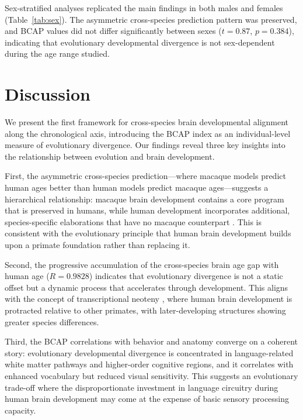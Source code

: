 \documentclass[11pt]{article}
\begin{document}
Sex-stratified analyses replicated the main findings in both males and females (Table~\ref{tab:sex}). The asymmetric cross-species prediction pattern was preserved, and BCAP values did not differ significantly between sexes ($t = 0.87$, $p = 0.384$), indicating that evolutionary developmental divergence is not sex-dependent during the age range studied.

\section{Discussion}

We present the first framework for cross-species brain developmental alignment along the chronological axis, introducing the BCAP index as an individual-level measure of evolutionary divergence. Our findings reveal three key insights into the relationship between evolution and brain development.

First, the asymmetric cross-species prediction---where macaque models predict human ages better than human models predict macaque ages---suggests a hierarchical relationship: macaque brain development contains a core program that is preserved in humans, while human development incorporates additional, species-specific elaborations that have no macaque counterpart \citep{hill2010similar, smaers2017evolution}. This is consistent with the evolutionary principle that human brain development builds upon a primate foundation rather than replacing it.

Second, the progressive accumulation of the cross-species brain age gap with human age ($R = 0.9828$) indicates that evolutionary divergence is not a static offset but a dynamic process that accelerates through development. This aligns with the concept of transcriptional neoteny \citep{somel2009transcriptomics}, where human brain development is protracted relative to other primates, with later-developing structures showing greater species differences.

Third, the BCAP correlations with behavior and anatomy converge on a coherent story: evolutionary developmental divergence is concentrated in language-related white matter pathways \citep{catani2005perisylvian, friederici2011brain} and higher-order cognitive regions, and it correlates with enhanced vocabulary but reduced visual sensitivity. This suggests an evolutionary trade-off where the disproportionate investment in language circuitry during human brain development may come at the expense of basic sensory processing capacity.
\end{document}
